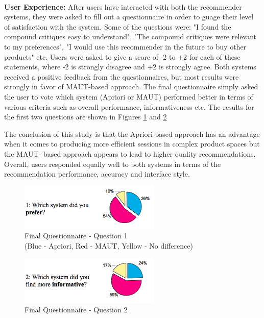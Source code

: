 \\
\textbf{User Experience:}
After users have interacted with both the recommender systems, they were asked to fill out a questionnaire in order to guage their level of satisfaction with the system.
Some of the questions were: "I found the compound critiques easy to understand", "The compound critiques were relevant to my preferences", "I would use this recommender in the future to buy other products" etc.
Users were asked to give a score of -2 to +2 for each of these statements, where -2 is strongly disagree and +2 is strongly agree.
Both systems received a positive feedback from the questionnaires, but most results were strongly in favor of MAUT-based approach.
The final questionnaire simply asked the user to vote which system (Apriori or MAUT) performed better in terms of various criteria such as overall performance, informativeness etc. The results for the first two questions are shown in Figures \ref{fig:q1} and \ref{fig:q2}

The conclusion of this study is that the Apriori-based approach has an advantage when it comes to producing more efficient sessions in complex product spaces but the MAUT- based approach appears to lead to higher quality recommendations. 
Overall, users responded equally well to both systems in terms of the recommendation performance, accuracy and interface style.

\begin{figure}
  \centering
  \captionsetup{justification=centering}
    \includegraphics[width=0.6\textwidth]{figures-bharath/firstQ_liveUser.png}
  \caption{Final Questionnaire - Question 1 \\(Blue - Apriori, Red - MAUT, Yellow - No difference)}
\label{fig:q1}
\end{figure}

\begin{figure}
  \centering
    \includegraphics[width=0.6\textwidth]{figures-bharath/secondQ_liveUser.png}
  \caption{Final Questionnaire - Question 2}
\label{fig:q2}
\end{figure}
